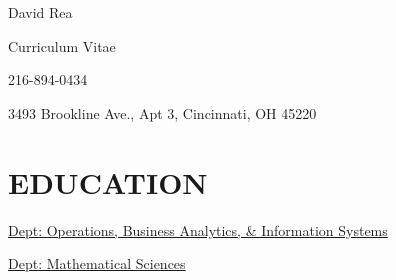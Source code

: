 \documentclass[12pt, letter]{moderncv}
\makeatletter
\newcommand{\cvitemleft}[3][.25em]{%
  \begin{tabular}{@{}p{\hintscolumnwidth}@{\hspace{\separatorcolumnwidth}}p{\maincolumnwidth}@{}}%
    \hintstyle{#2} &{#3}%
  \end{tabular}%
  \par\addvspace{#1}
}
\newcommand{\cventryleft}[7][.25em]{%
  \cvitemleft[#1]{#2}{%
  	{#3 }%
  	\ifthenelse{\equal{#4 }{}}{}{{#4 }}%
  	\ifthenelse{\equal{#5 }{}}{}{#5 }%
  	\ifthenelse{\equal{#6 }{}}{}{#6 }%
  	\ifthenelse{\equal{#7 }{}}{}{#7 }%
  }}
\newcommand{\simpleHeader}[4]{
	\centerline{\Huge{#1}}
	\centerline{Curriculum Vitae}
		\smallskip
	\centerline{\small#2  {\Large\textperiodcentered} \small#3}
	\centerline{\small#4}
}
\makeatother
\begin{document}
\simpleHeader{David Rea}{}{216-894-0434}{3493 Brookline Ave., Apt 3, Cincinnati, OH 45220}
\section{EDUCATION}
\smallskip


\tltext{\scriptsize\small}
\tltextend[west]{\scriptsize\small}
\tltextstart[east]{\scriptsize\small}

{\hspace*{.35in} \href{https://business.uc.edu/faculty-and-research/departments/obais.html}{Dept: Operations, Business Analytics, \& Information Systems}}{}{}{}


{\hspace*{.35in}\href{https://www.clemson.edu/science/departments/math-stat/}{ Dept: Mathematical Sciences}}{}{}

\end{document}
